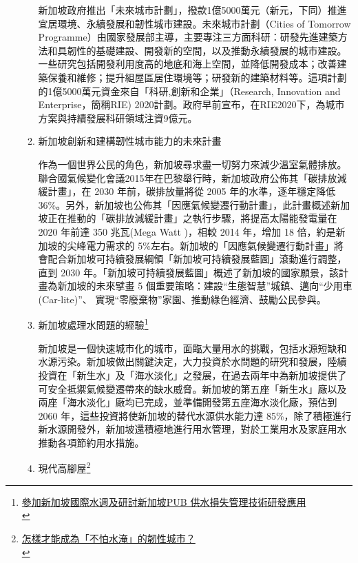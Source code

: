 \documentclass[a4paper,12pt]{article}
\begin{document}
\begin{enumerate}
\begin{enumerate}
新加坡政府推出「未來城市計劃」，撥款1億5000萬元（新元，下同）推進宜居環境、永續發展和韌性城市建設。未來城市計劃（Cities of Tomorrow Programme）由國家發展部主導，主要專注三方面科研：研發先進建築方法和具韌性的基礎建設、開發新的空間，以及推動永續發展的城市建設。\\

一些研究包括開發利用度高的地底和海上空間，並降低開發成本；改善建築保養和維修；提升組屋區居住環境等；研發新的建築材料等。這項計劃的1億5000萬元資金來自「科研,創新和企業」（Research, Innovation and Enterprise，簡稱RIE) 2020計劃。政府早前宣布，在RIE2020下，為城市方案與持續發展科研領域注資9億元。\\

\item 新加坡創新和建構韌性城市能力的未來計畫
\label{sec:orgc7c9e17}

作為一個世界公民的角色，新加坡尋求盡一切努力來減少溫室氣體排放。聯合國氣候變化會議2015年在巴黎舉行時，新加坡政府公佈其「碳排放減緩計畫」，在 2030 年前，碳排放量將從 2005 年的水準，逐年穩定降低 36\%。另外，新加坡也公佈其「因應氣候變遷行動計畫」，此計畫概述新加坡正在推動的「碳排放減緩計畫」之執行步驟，將提高太陽能發電量在 2020 年前達 350 兆瓦(Mega Watt )，相較 2014 年，增加 18 倍，約是新加坡的尖峰電力需求的 5\%左右。新加坡的「因應氣候變遷行動計畫」將會配合新加坡可持續發展綱領「新加坡可持續發展藍圖」滾動進行調整，直到 2030 年。「新加坡可持續發展藍圖」概述了新加坡的國家願景，該計畫為新加坡的未來擘畫 5 個重要策略：建設“生態智慧”城鎮、邁向“少用車(Car-lite)”、 實現“零廢棄物”家園、推動綠色經濟、鼓勵公民參與。\\

\item 新加坡處理水問題的經驗\footnote{\href{https://report.nat.gov.tw/ReportFront/PageSystem/reportFileDownload/C10502349/001}{參加新加坡國際水週及研討新加坡PUB 供水損失管理技術研發應用}\\}
\label{sec:orgf1cf5b3}

新加坡是一個快速城市化的城市，面臨大量用水的挑戰，包括水源短缺和水源污染。新加坡做出關鍵決定，大力投資於水問題的研究和發展，陸續投資在「新生水」及「海水淡化」之發展，在過去兩年中為新加坡提供了可安全抵禦氣候變遷帶來的缺水威脅。新加坡的第五座「新生水」廠以及兩座「海水淡化」廠均已完成，並準備開發第五座海水淡化廠，預估到 2060 年，這些投資將使新加坡的替代水源供水能力達 85\%，除了積極進行新水源開發外，新加坡還積極地進行用水管理，對於工業用水及家庭用水推動各項節約用水措施。\\

\item 現代高腳屋\footnote{\href{https://kungsdailylife.blogspot.com/2019/05/blog-post\_34.html}{怎樣才能成為「不怕水淹」的韌性城市？ }\\}
\label{sec:orgc186cb3}


\end{enumerate}
\end{enumerate}
\end{document}
